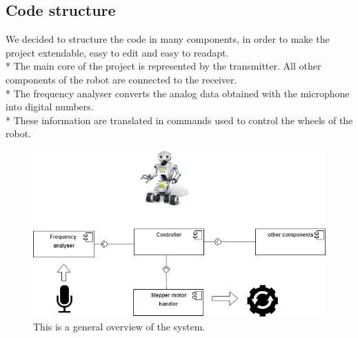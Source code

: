 \subsection{Code structure}
We decided to structure the code in many components, in order to make the project extendable, easy to edit and easy to readapt.\\*
The main core of the project is represented by the transmitter. All other components of the robot are connected to the receiver.\\*
The frequency analyser converts the analog data obtained with the microphone into digital numbers.\\*
These information are translated in commands used to control the wheels of the robot.

\newpage
\begin{figure}[h!]
	\hspace*{-0.15 \textwidth}\includegraphics[width= 1.3\textwidth]
	{files/images/SystemStructure}
	\caption{This is a general overview of the system.}
\end{figure}